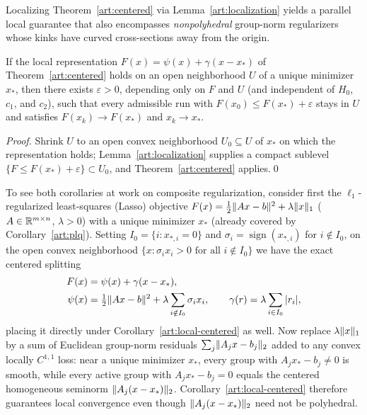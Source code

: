 Localizing Theorem~\ref{art:centered} via Lemma~\ref{art:localization} yields a
parallel local guarantee that also encompasses \emph{nonpolyhedral} group-norm
regularizers whose kinks have curved cross-sections away from the origin.

\begin{corollary}\label{art:local-centered}
If the local representation $F(x)=\psi(x)+\gamma(x-x_*)$ of
Theorem~\ref{art:centered} holds on an open neighborhood $U$ of a unique
minimizer $x_*$, then there exists $\varepsilon>0$, depending only on $F$ and
$U$ (and independent of $H_0$, $c_1$, and $c_2$), such that every admissible run
with $F(x_0)\le F(x_*)+\varepsilon$ stays in $U$ and satisfies
$F(x_k)\to F(x_*)$ and $x_k\to x_*$.
\end{corollary}
\begin{proof}
Shrink $U$ to an open convex neighborhood $U_0\subseteq U$ of $x_*$ on which the
representation holds; Lemma~\ref{art:localization} supplies a compact sublevel
$\{F\le F(x_*)+\varepsilon\}\subset U_0$, and Theorem~\ref{art:centered}
applies.\qed
\end{proof}

To see both corollaries at work on composite regularization, consider first the
$\ell_1$-regularized least-squares (Lasso) objective
$F(x)=\tfrac12\lVert Ax-b\rVert^2+\lambda\lVert x\rVert_1$ ($A\in\mathbb R^{m\times n}$, $\lambda>0$)
with a unique minimizer $x_*$ (already covered by Corollary~\ref{art:plq}).
Setting \mbox{$I_0=\{i:x_{*,i}=0\}$} and $\sigma_i=\operatorname{sign}(x_{*,i})$
for $i\notin I_0$, on the open convex neighborhood
$\{x:\sigma_ix_i>0\text{ for all }i\notin I_0\}$ we have the exact centered
splitting
\begin{equation}\label{art:local-l1-decomposition}
 \begin{aligned}
 F(x)&=\psi(x)+\gamma(x-x_*),\\
 \psi(x)&=\tfrac12\lVert Ax-b\rVert^2+\lambda\sum_{i\notin I_0}\sigma_ix_i,\qquad
 \gamma(r)=\lambda\sum_{i\in I_0}|r_i|,
 \end{aligned}
\end{equation}
placing it directly under Corollary~\ref{art:local-centered} as well. Now
replace $\lambda\lVert x\rVert_1$ by a sum of Euclidean group-norm residuals
$\sum_j\lVert A_jx-b_j\rVert_2$ added to any convex locally $C^{1,1}$ loss: near a
unique minimizer $x_*$, every group with $A_jx_*-b_j\ne0$ is smooth, while every
active group with $A_jx_*-b_j=0$ equals the centered homogeneous seminorm
$\lVert A_j(x-x_*)\rVert_2$. Corollary~\ref{art:local-centered} therefore guarantees
local convergence even though $\lVert A_j(x-x_*)\rVert_2$ need not be polyhedral.

